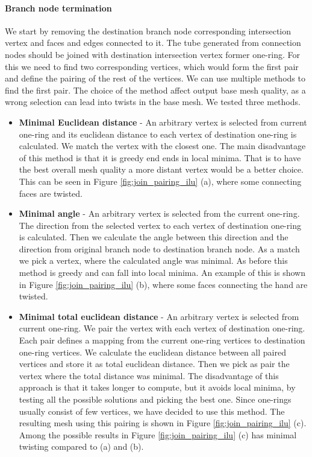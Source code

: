 \paragraph{Branch node termination}
We start by removing the destination branch node corresponding intersection vertex and faces and edges connected to it. The tube generated from connection nodes should be joined with destination intersection vertex former one-ring. For this we need to find two corresponding vertices, which would form the first pair and define the pairing of the rest of the vertices. We can use multiple methods to find the first pair. The choice of the method affect output base mesh quality, as a wrong selection can lead into twists in the base mesh. We tested three methods.
\begin{itemize}
	\itemsep-0.25em 
	\item \textbf{Minimal Euclidean distance} - An arbitrary vertex is selected from current one-ring and its euclidean distance to each vertex of destination one-ring is calculated. We match the vertex with the closest one. The main disadvantage of this method is that it is greedy end ends in local minima. That is to have the best overall mesh quality a more distant vertex would be a better choice. This can be seen in Figure \ref{fig:join_pairing_ilu} (a), where some connecting faces are twisted.
	\item \textbf{Minimal angle} - An arbitrary vertex is selected from the current one-ring. The direction from the selected vertex to each vertex of destination one-ring is calculated. Then we calculate the angle between this direction and the direction from original branch node to destination branch node. As a match we pick a vertex, where the calculated angle was minimal. As before this method is greedy and can fall into local minima. An example of this is shown in Figure \ref{fig:join_pairing_ilu} (b), where some faces connecting the hand are twisted.
	\item \textbf{Minimal total euclidean distance} - An arbitrary vertex is selected from current one-ring. We pair the vertex with each vertex of destination one-ring. Each pair defines a mapping from the current one-ring vertices to destination one-ring vertices. We calculate the euclidean distance between all paired vertices and store it as total euclidean distance. Then we pick as pair the vertex where the total distance was minimal. The disadvantage of this approach is that it takes longer to compute, but it avoids local minima, by testing all the possible solutions and picking the best one. Since one-rings usually consist of few vertices, we have decided to use this method. The resulting mesh using this pairing is shown in Figure \ref{fig:join_pairing_ilu} (c). Among the possible results in Figure \ref{fig:join_pairing_ilu} (c) has minimal twisting compared to (a) and (b). 
\end{itemize}

